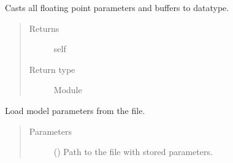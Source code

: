 \documentclass[letterpaper,10pt,english]{sphinxmanual}
\begin{document}
\begin{fulllineitems}
\begin{fulllineitems}
\begin{quote}
\begin{description}
\end{description}\end{quote}

\end{fulllineitems}


\begin{fulllineitems}
\label{\detokenize{api/dynamics:geology.metamodelling.dynamics.NeuralDifferentialEquation.half}}
Casts all floating point parameters and buffers to  datatype.
\begin{quote}\begin{description}
\item[{Returns}] \leavevmode
self

\item[{Return type}] \leavevmode
Module

\end{description}\end{quote}

\end{fulllineitems}


\begin{fulllineitems}
\label{\detokenize{api/dynamics:geology.metamodelling.dynamics.NeuralDifferentialEquation.load}}
Load model parameters from the file.
\begin{quote}\begin{description}
\item[{Parameters}] \leavevmode
{} () \textendash{} Path to the file with stored parameters.

\end{description}\end{quote}

\end{fulllineitems}



\end{fulllineitems}
\end{document}
